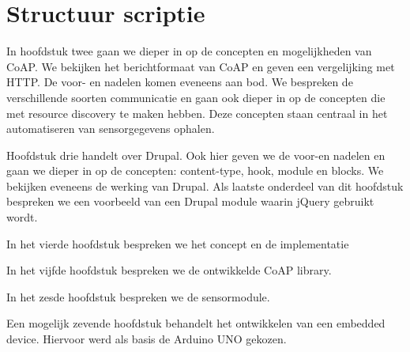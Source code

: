 \section{Structuur scriptie}

In hoofdstuk twee gaan we dieper in op de concepten en mogelijkheden van CoAP. We bekijken het berichtformaat van CoAP en geven een vergelijking met HTTP. De voor- en nadelen komen eveneens aan bod. We bespreken de verschillende soorten communicatie en gaan ook dieper in op de concepten die met resource discovery te maken hebben. Deze concepten staan centraal in het automatiseren van sensorgegevens ophalen. %

Hoofdstuk drie handelt over Drupal. Ook hier geven we de voor-en nadelen en gaan we dieper in op de concepten: content-type, hook, module en blocks. We bekijken eveneens de werking van Drupal. Als laatste onderdeel van dit hoofdstuk bespreken we een voorbeeld van een Drupal module waarin jQuery gebruikt wordt. %

In het vierde hoofdstuk bespreken we het concept en de implementatie 

In het vijfde hoofdstuk bespreken we de ontwikkelde CoAP library. %

In het zesde hoofdstuk bespreken we de sensormodule. %

Een mogelijk zevende hoofdstuk behandelt het ontwikkelen van een embedded device. Hiervoor werd als basis de Arduino UNO gekozen.










